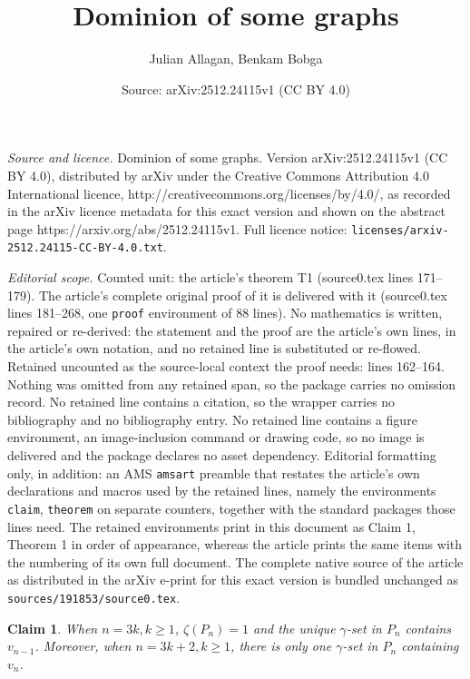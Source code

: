 \documentclass[10pt,a4paper]{amsart}
\title{Dominion of some graphs}
\author{Julian Allagan, Benkam Bobga}
\date{Source: arXiv:2512.24115v1 (CC BY 4.0)}
\newtheorem{claim}{Claim}
\begin{document}
\maketitle

\noindent\emph{Source and licence.} Dominion of some graphs. Version arXiv:2512.24115v1 (CC BY 4.0), distributed by arXiv under the Creative Commons Attribution 4.0 International licence, http://creativecommons.org/licenses/by/4.0/, as recorded in the arXiv licence metadata for this exact version and shown on the abstract page https://arxiv.org/abs/2512.24115v1. Full licence notice: \texttt{licenses/arxiv-2512.24115-CC-BY-4.0.txt}.\par\smallskip

\noindent\textit{Editorial scope.} Counted unit: the article's theorem T1 (source0.tex lines 171--179). The article's complete original proof of it is delivered with it (source0.tex lines 181--268, one \texttt{proof} environment of 88 lines). No mathematics is written, repaired or re-derived: the statement and the proof are the article's own lines, in the article's own notation, and no retained line is substituted or re-flowed.  Retained uncounted as the source-local context the proof needs: lines 162--164.  Nothing was omitted from any retained span, so the package carries no omission record.  No retained line contains a citation, so the wrapper carries no bibliography and no bibliography entry.  No retained line contains a figure environment, an image-inclusion command or drawing code, so no image is delivered and the package declares no asset dependency.  Editorial formatting only, in addition: an AMS \texttt{amsart} preamble that restates the article's own declarations and macros used by the retained lines, namely the environments \texttt{claim}, \texttt{theorem} on separate counters, together with the standard packages those lines need.  The retained environments print in this document as Claim 1, Theorem 1 in order of appearance, whereas the article prints the same items with the numbering of its own full document.  The complete native source of the article as distributed in the arXiv e-print for this exact version is bundled unchanged as \texttt{sources/191853/source0.tex}.
\begin{claim}{\label{c4}}
	When $n=3k, k\ge 1$, $\zeta(P_n)=1$ and the unique $\gamma$-set in $P_n$ contains $v_{n-1}$. Moreover, when $n=3k+2, k\ge 1$, there is only one $\gamma$-set in $P_n$ containing $v_{n}$. 
\end{claim}
\end{document}
